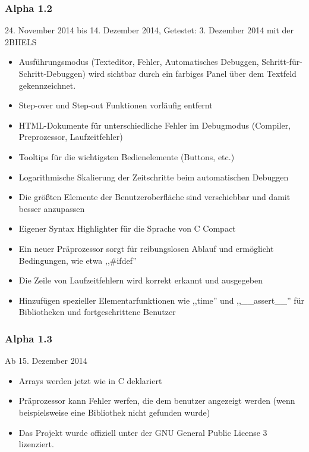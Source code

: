 \subsubsection*{Alpha 1.2}
24. November 2014 bis 14. Dezember 2014,\newline
Getestet: 3. Dezember 2014 mit der 2BHELS
\begin{itemize}
\item Ausführungsmodus (Texteditor, Fehler, Automatisches Debuggen, Schritt-für-Schritt-Debuggen) wird sichtbar durch ein farbiges Panel über dem Textfeld gekennzeichnet.
\item Step-over und Step-out Funktionen vorläufig entfernt
\item HTML-Dokumente für unterschiedliche Fehler im Debugmodus (Compiler, Preprozessor, Laufzeitfehler)
\item Tooltips für die wichtigsten Bedienelemente (Buttons, etc.)
\item Logarithmische Skalierung der Zeitschritte beim automatischen Debuggen
\item Die größten Elemente der Benutzeroberfläche sind verschiebbar und damit besser anzupassen
\item Eigener Syntax Highlighter für die Sprache von C Compact 
\item Ein neuer Präprozessor sorgt für reibungslosen Ablauf und ermöglicht Bedingungen, wie etwa ,,#ifdef''
\item Die Zeile von Laufzeitfehlern wird korrekt erkannt und ausgegeben
\item Hinzufügen spezieller Elementarfunktionen wie ,,time'' und ,,\_\_assert\_\_'' für Bibliotheken und fortgeschrittene Benutzer
\end{itemize}

\subsubsection*{Alpha 1.3}
Ab 15. Dezember 2014
\begin{itemize}
\item Arrays werden jetzt wie in C deklariert
\item Präprozessor kann Fehler werfen, die dem benutzer angezeigt werden (wenn beispielsweise eine Bibliothek nicht gefunden wurde)
\item Das Projekt wurde offiziell unter der GNU General Public License 3 lizenziert.
\end{itemize}

